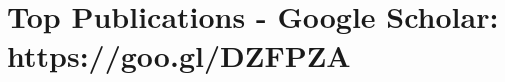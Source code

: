 \newcommand\textlcsc[1]{\textsc{\MakeTextLowercase{#1}}}
\section{Top Publications - \normalsize{Google Scholar: }\textup{https://goo.gl/DZFPZA}}
\begin{itemize}
\setlength\itemsep{-5pt}

\end{itemize}
